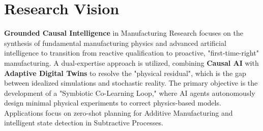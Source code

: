 \documentclass{resume}
\begin{document}
\newcommand{\enote}[1]{%
  \colorbox{yellow!30}{\textcolor{OliveGreen}{#1}}%
}
\newcommand{\note}[1]{}
\newcommand{\cnote}[1]{}
\vspace{2mm}


\section{Research Vision}
\textbf{Grounded Causal Intelligence} in Manufacturing Research focuses on the synthesis of fundamental manufacturing physics and advanced artificial intelligence to transition from reactive qualification to proactive, "first-time-right" manufacturing. A dual-expertise approach is utilized, combining \textbf{Causal AI} with \textbf{Adaptive Digital Twins} to resolve the "physical residual", which is the gap between idealized simulations and stochastic reality. The primary objective is the development of a "Symbiotic Co-Learning Loop," where AI agents autonomously design minimal physical experiments to correct physics-based models. Applications focus on zero-shot planning for Additive Manufacturing and intelligent state detection in Subtractive Processes.
\end{document}
